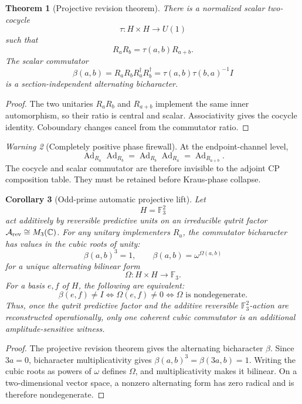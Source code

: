 \documentclass[11pt,oneside,openany]{book}
\numberwithin{equation}{chapter}
\newtheorem{theorem}{Theorem}[chapter]
\newtheorem{corollary}[theorem]{Corollary}
\theoremstyle{definition}
\theoremstyle{remark}
\newtheorem{warning}[theorem]{Warning}
\newcommand{\C}{\mathbb C}
\newcommand{\Ad}{\operatorname{Ad}}
\begin{document}
\begin{theorem}[Projective revision theorem]
\label{thm:projective-revision}
There is a normalized scalar two-cocycle
\[
 \tau:H\times H\to U(1)
\]
such that
\[
 \boxed{R_aR_b=\tau(a,b)R_{a+b}.}
\]
The scalar commutator
\[
 \boxed{
 \beta(a,b)
 =
 R_aR_bR_a^\dagger R_b^\dagger
 =
 \tau(a,b)\tau(b,a)^{-1}I}
\]
is a section-independent alternating bicharacter.
\end{theorem}

\begin{proof}
The two unitaries \(R_aR_b\) and \(R_{a+b}\) implement the same inner
automorphism, so their ratio is central and scalar.  Associativity gives the
cocycle identity.  Coboundary changes cancel from the commutator ratio.
\end{proof}

\begin{warning}[Completely positive phase firewall]
At the endpoint-channel level,
\[
 \Ad_{R_a}\Ad_{R_b}
 =
 \Ad_{R_b}\Ad_{R_a}
 =
 \Ad_{R_{a+b}}.
\]
The cocycle and scalar commutator are therefore invisible to the adjoint CP
composition table.  They must be retained before Kraus-phase collapse.
\end{warning}

\begin{corollary}[Odd-prime automatic projective lift]
\label{cor:odd-prime-projective-lift}
Let
\[
 H=\mathbb F_3^2
\]
act additively by reversible predictive units on an irreducible qutrit factor
\(\mathcal A_{\rm rev}\cong M_3(\C)\).  For any unitary implementers
\(R_a\), the commutator bicharacter has values in the cubic roots of unity:
\[
 \boxed{
 \beta(a,b)^3=1,
 \qquad
 \beta(a,b)=\omega^{\Omega(a,b)}}
\]
for a unique alternating bilinear form
\[
 \Omega:H\times H\longrightarrow\mathbb F_3.
\]
For a basis \(e,f\) of \(H\), the following are equivalent:
\[
 \boxed{
 \beta(e,f)\ne I
 \iff
 \Omega(e,f)\ne0
 \iff
 \Omega\text{ is nondegenerate}.}
\]
Thus, once the qutrit predictive factor and the additive reversible
\(\mathbb F_3^2\)-action are reconstructed operationally, only one coherent
cubic commutator is an additional amplitude-sensitive witness.
\end{corollary}

\begin{proof}
The projective revision theorem gives the alternating bicharacter \(\beta\).
Since \(3a=0\), bicharacter multiplicativity gives
\(\beta(a,b)^3=\beta(3a,b)=1\).  Writing the cubic roots as powers of
\(\omega\) defines \(\Omega\), and multiplicativity makes it bilinear.  On a
two-dimensional vector space, a nonzero alternating form has zero radical and
is therefore nondegenerate.
\end{proof}
\end{document}
